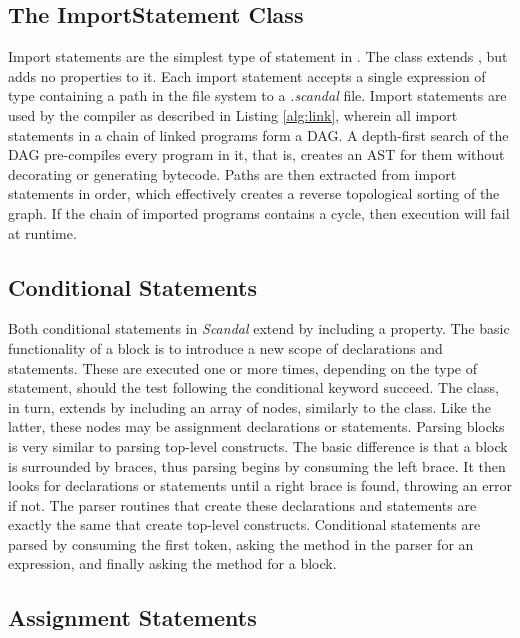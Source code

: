 \subsection{The ImportStatement Class}

Import statements are the simplest type of statement in . The  class extends , but adds no properties to it. Each import statement accepts a single expression of type  containing a path in the file system to a \emph{.scandal} file. Import statements are used by the compiler as described in Listing \ref{alg:link}, wherein all import statements in a chain of linked programs form a DAG. A depth-first search of the DAG pre-compiles every program in it, that is, creates an AST for them without decorating or generating bytecode. Paths are then extracted from import statements in order, which effectively creates a reverse topological sorting of the graph. If the chain of imported programs contains a cycle, then execution will fail at runtime.

\subsection{Conditional Statements}

Both conditional statements in \emph{Scandal} extend  by including a  property. The basic functionality of a block is to introduce a new scope of declarations and statements. These are executed one or more times, depending on the type of statement, should the test following the conditional keyword succeed. The  class, in turn, extends  by including an array of nodes, similarly to the  class. Like the latter, these nodes may be assignment declarations or statements. Parsing blocks is very similar to parsing top-level constructs. The basic difference is that a block is surrounded by braces, thus parsing begins by consuming the left brace. It then looks for declarations or statements until a right brace is found, throwing an error if not. The parser routines that create these declarations and statements are exactly the same that create top-level constructs. Conditional statements are parsed by consuming the first token, asking the  method in the parser for an expression, and finally asking the  method for a block.

\subsection{Assignment Statements}

